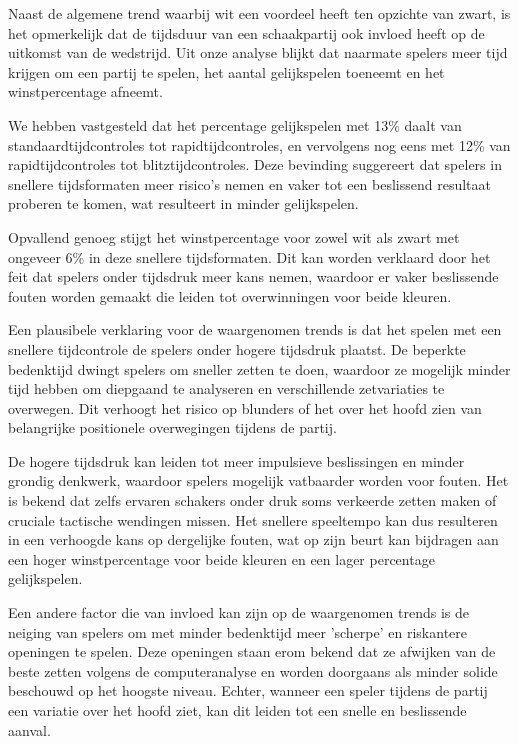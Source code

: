 Naast de algemene trend waarbij wit een voordeel heeft ten opzichte van zwart, is het opmerkelijk dat de tijdsduur van een schaakpartij ook invloed heeft op de uitkomst van de wedstrijd. Uit onze analyse blijkt dat naarmate spelers meer tijd krijgen om een partij te spelen, het aantal gelijkspelen toeneemt en het winstpercentage afneemt.

We hebben vastgesteld dat het percentage gelijkspelen met 13\% daalt van standaardtijdcontroles tot rapidtijdcontroles, en vervolgens nog eens met 12\% van rapidtijdcontroles tot blitztijdcontroles. Deze bevinding suggereert dat spelers in snellere tijdsformaten meer risico's nemen en vaker tot een beslissend resultaat proberen te komen, wat resulteert in minder gelijkspelen.

Opvallend genoeg stijgt het winstpercentage voor zowel wit als zwart met ongeveer 6\% in deze snellere tijdsformaten. Dit kan worden verklaard door het feit dat spelers onder tijdsdruk meer kans nemen, waardoor er vaker beslissende fouten worden gemaakt die leiden tot overwinningen voor beide kleuren.

Een plausibele verklaring voor de waargenomen trends is dat het spelen met een snellere tijdcontrole de spelers onder hogere tijdsdruk plaatst. De beperkte bedenktijd dwingt spelers om sneller zetten te doen, waardoor ze mogelijk minder tijd hebben om diepgaand te analyseren en verschillende zetvariaties te overwegen. Dit verhoogt het risico op blunders of het over het hoofd zien van belangrijke positionele overwegingen tijdens de partij.

De hogere tijdsdruk kan leiden tot meer impulsieve beslissingen en minder grondig denkwerk, waardoor spelers mogelijk vatbaarder worden voor fouten. Het is bekend dat zelfs ervaren schakers onder druk soms verkeerde zetten maken of cruciale tactische wendingen missen. Het snellere speeltempo kan dus resulteren in een verhoogde kans op dergelijke fouten, wat op zijn beurt kan bijdragen aan een hoger winstpercentage voor beide kleuren en een lager percentage gelijkspelen.

Een andere factor die van invloed kan zijn op de waargenomen trends is de neiging van spelers om met minder bedenktijd meer 'scherpe' en riskantere openingen te spelen. Deze openingen staan erom bekend dat ze afwijken van de beste zetten volgens de computeranalyse en worden doorgaans als minder solide beschouwd op het hoogste niveau. Echter, wanneer een speler tijdens de partij een variatie over het hoofd ziet, kan dit leiden tot een snelle en beslissende aanval.

